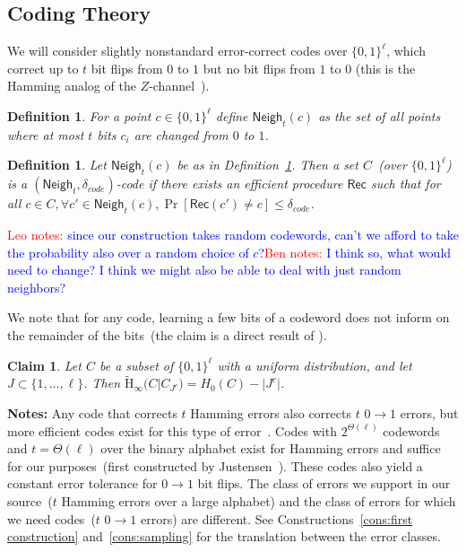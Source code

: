 \documentclass[11pt]{article}
\newcommand{\defref}[1]{\mbox{Definition~\ref{#1}}}
\newcommand{\class}[1]{{\ensuremath{\mathsf{#1}}}}
\newcommand{\rec}{\ensuremath{\class{Rec}}\xspace}
\newcommand{\zo}{\ensuremath{\{0, 1\}}}
\newcommand{\neigh}{\ensuremath{\class{Neigh}}\xspace}
\newcommand{\Hav}{\tilde{\mathrm{H}}_\infty}
\newtheorem{definition}[theorem]{Definition}
\newtheorem{claim}[theorem]{Claim}
\newcommand{\authnote}[2]{{\textcolor{red}{\textsf{#1 notes: }\textcolor{blue}{ #2}}\marginpar{\textcolor{red}{\textbf{!!!!!}}}}}
\newcommand{\authnote}[2]{}
\newcommand{\bnote}[1]{{\authnote{Ben}{#1}}}
\newcommand{\lnote}[1]{{\authnote{Leo}{#1}}}
\begin{document}
\subsection{Coding Theory}
\label{sec:coding theory}
We will consider slightly nonstandard error-correct codes over $\{0,1\}^\ell$, which correct up to $t$ bit flips from $0$ to $1$ but no bit flips from $1$ to $0$ (this is the Hamming analog of the $Z$-channel~\cite{tallini2002capacity}).
\begin{definition}
\label{def:hamming z channel}
For a point $c\in \zo^\ell$ define $\neigh_t(c) $ as the set of all points where at most $t$ bits $c_i$ are changed from $0$ to $1$.
\end{definition}

\begin{definition}
Let $\neigh_t(c)$ be as in \defref{def:hamming z channel}.  Then a set $C$~(over $\zo^\ell$) is a $(\neigh_t, \delta_{code})$-code if there exists an efficient procedure $\rec$ such that for all $c\in C, \forall c'\in \neigh_t(c), \Pr[\rec(c') \neq c] \leq \delta_{code}$.
\end{definition}

\lnote{since our construction takes random codewords, can't we afford to take the probability also over a random choice of $c$?}\bnote{I think so, what would need to change?  I think we might also be able to deal with just random neighbors?}


We note that for any code, learning a few bits of a codeword does not inform on the remainder of the bits~(the claim is a direct result of \cite[Lemma 2.2b]{DBLP:journals/siamcomp/DodisORS08}).

\begin{claim}
\label{cl:many locations ent}
Let $C$ be a subset of $\{0,1\}^\ell$ with a uniform distribution, and let $J\subset \{1,\dots,\ell\}$.  Then $\Hav(C | C_{J^c}) =  H_0(C) - |J^c|$.
\end{claim}

\textbf{Notes:}
Any code that corrects $t$ Hamming errors also corrects $t$ $0\rightarrow 1$ errors, but more efficient codes  exist for this type of error~\cite{tallini2002capacity}.
 Codes with $2^{\Theta(\ell)}$ codewords and $t = \Theta(\ell)$ over the binary alphabet exist for Hamming errors and suffice for our purposes~(first constructed by Justensen~\cite{justesen1972class}).  These codes also yield a constant error tolerance for $0\rightarrow 1$ bit flips.
The class of errors we support in our source~($t$ Hamming errors over a large alphabet) and the class of errors for which we need codes~($t$ $0\rightarrow 1$ errors) are different.  See Constructions~\ref{cons:first construction} and~\ref{cons:sampling} for the translation between the error classes.
\end{document}
